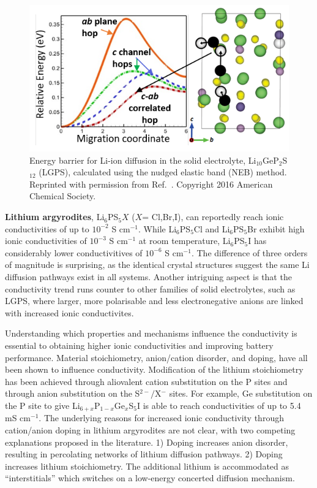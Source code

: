 \documentclass[../main.tex]{subfiles}
\begin{document}
\begin{figure}
    \centering
    \includegraphics[scale=1.2]{figures/lgps.png}
    \caption{Energy barrier for Li-ion diffusion in the solid electrolyte, Li$_{10}$GeP$_2$S$_{12}$ (LGPS), calculated using the nudged elastic band (NEB) method. Reprinted with permission from Ref.~. Copyright 2016 American Chemical Society.}
    \label{fig:lgps}
\end{figure}

\textbf{Lithium argyrodites}, Li$_6$PS$_{5}X$ ($X$= Cl,Br,I), can reportedly reach ionic conductivities of up to $10^{-2}$ S cm$^{-1}$.\cite{deiseroth_li6ps5x_2008} While Li$_6$PS$_{5}$Cl and Li$_6$PS$_{5}$Br exhibit high ionic conductivities of $10^{-3}$ S cm$^{-1}$ at room temperature, Li$_6$PS$_{5}$I has considerably lower conductivitives of $10^{-6}$ S cm$^{-1}$.\cite{zhou2021innovative} The difference of three orders of magnitude is surprising, as the identical crystal structures suggest the same Li diffusion pathways exist in all systems. Another intriguing aspect is that the conductivity trend runs counter to other families of solid electrolytes, such as LGPS, where larger, more polarisable and less electronegative anions are linked with increased ionic conductivites.\cite{bachman2016inorganic}

Understanding which properties and mechanisms influence the conductivity is essential to obtaining higher ionic conductivities and improving battery performance. Material stoichiometry, anion/cation disorder, and doping, have all been shown to influence conductivity. Modification of the lithium stoichiometry has been achieved through aliovalent cation substitution on the P sites\cite{kraft2018,ohno2019further,zhao2020versatile,ZhouEtAl_JAmChemSoc2019} and through anion substitution on the S$^{2-}/$X$^-$ sites.\cite{adeli2019,zhou_solvent-engineered_2019,wang2020fast}
For example, Ge substitution on the P site to give Li$_{6+x}$P$_{1-x}$Ge$_x$S$_5$I is able to reach conductivities of up to 5.4 mS cm$^{-1}$.\cite{kraft2018,ZhouEtAl_JAmChemSoc2019} The underlying reasons for increased ionic conductivity through cation/anion doping in lithium argyrodites are not clear, with two competing explanations proposed in the literature.
1) Doping increases anion disorder, resulting in percolating networks of lithium diffusion pathways.\cite{morgan2020mechanistic}
2) Doping increases lithium stoichiometry. The additional lithium is accommodated as ``interstitials'' which switches on a low-energy concerted diffusion mechanism.
\end{document}
